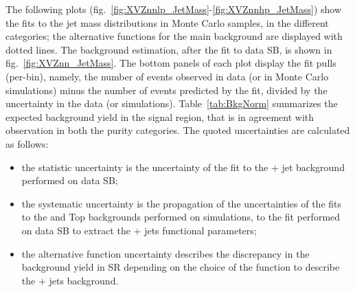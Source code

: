 \noindent The following plots (fig.~\ref{fig:XVZnnlp_JetMass}-\ref{fig:XVZnnhp_JetMass}) show the fits to the jet mass distributions in Monte Carlo samples, in the different categories; the alternative functions for the main background are displayed with dotted lines. The background estimation, after the fit to data SB, is shown in fig.~\ref{fig:XVZnn_JetMass}. The bottom panels of each plot display the fit pulls (per-bin), namely, the number of events observed in data (or in Monte Carlo simulations) minus the number of events predicted by the fit, divided by the uncertainty in the data (or simulations). Table~\ref{tab:BkgNorm} summarizes the expected background yield in the signal region, that is in agreement with observation in both the purity categories. The quoted uncertainties are calculated as follows:
\begin{itemize}
\item the statistic uncertainty is the uncertainty of the fit to the \V + jet background performed on data SB;
\item the systematic uncertainty is the propagation of the uncertainties of the fits to the \VV and Top backgrounds performed on simulations, to the fit performed on data SB to extract the \V + jets functional parameters;
\item the alternative function uncertainty describes the discrepancy in the background yield in SR depending on the choice of the function to describe the \V + jets background.
\end{itemize}







